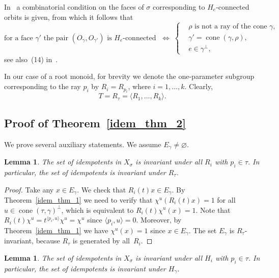 \documentclass[a4paper, 11pt]{amsart}
\theoremstyle{plain}
\newtheorem{lemma}[theorem]{Lemma}
\theoremstyle{remark}
\theoremstyle{definition}
\DeclareMathOperator{\cone}{cone}
\begin{document}
In~\cite[Lemma 2.2]{AKZ2012} a combinatorial condition on the faces of $\sigma$ corresponding to $H_e$-connected orbits is given, from which it follows that 
	\begin{equation}\label{idempHe_lemeq}
		\text{for a face $\gamma'$ the pair $(O_\gamma, O_{\gamma'})$ is $H_e$-connected } \; \Leftrightarrow \; 
		\left\{\begin{aligned}
			&\text{$\rho$ is not a ray of the cone~$\gamma$},\\
			&\gamma' = \cone(\gamma, \rho),\\
			&e \in \gamma^\perp,
		\end{aligned}\right.
	\end{equation}
see also~(14) in~\cite{YZ}.

In our case of a root monoid, for brevity we denote the one-parameter subgroup corresponding to the ray $p_i$ by $R_i = R_{p_i}$, where $i = 1, \ldots, k$. Clearly,
\[T = R_\tau = \langle R_1, \ldots, R_k\rangle.\]

\subsection{Proof of Theorem~\ref{idem_thm_2}}
We prove several auxiliary statements. We assume $E_\gamma \neq \varnothing$. 

\begin{lemma}\label{invar}
The set of idempotents in $X_\sigma$ is invariant under all $R_i$ with $p_i \in \tau$. In particular, the set of idempotents is invariant under $R_\tau$.	
\end{lemma}

\begin{proof} Take any $x \in E_\gamma$. We check that $R_i(t) x \in E_\gamma$. By Theorem~\ref{idem_thm_1} we need to verify that $\chi^u(R_i(t) x) = 1$ for all ${u \in \cone(\tau, \gamma)^\perp}$, which is equivalent to $R_i(t)\chi^u(x) = 1$. Note that $R_i(t)\chi^u = t^{\langle p_i, u \rangle}\chi^u = \chi^u$ since $\langle p_i, u \rangle = 0$. Moreover, by Theorem~\ref{idem_thm_1} we have $\chi^u (x) = 1$ since $x \in E_\gamma$. The set $E_\gamma$ is $R_\tau$-invariant, because $R_\tau$ is generated by all~$R_i$.	
\end{proof}

\begin{lemma}\label{st:h-idem}
The set of idempotents in $X_\sigma$ is invariant under all $H_i$ with $p_i \in \tau$. In particular, the set of idempotents is invariant under $H_\gamma$.
\end{lemma}
\end{document}
